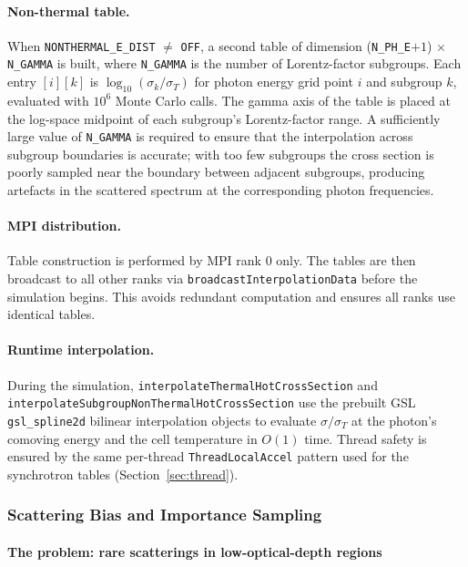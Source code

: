 \documentclass[12pt,a4paper]{article}
\newcommand{\code}[1]{\texttt{#1}}
\begin{document}
\paragraph{Non-thermal table.}
When \code{NONTHERMAL\_E\_DIST} $\ne$ \code{OFF}, a second table of
dimension (\code{N\_PH\_E}$+1$) $\times$ \code{N\_GAMMA} is built, where
\code{N\_GAMMA} is the number of Lorentz-factor subgroups.  Each entry
$[i][k]$ is $\log_{10}(\sigma_k/\sigma_T)$ for photon energy grid point
$i$ and subgroup $k$, evaluated with $10^6$ Monte Carlo calls.  The gamma
axis of the table is placed at the log-space midpoint of each subgroup's
Lorentz-factor range.  A sufficiently large value of \code{N\_GAMMA} is
required to ensure that the interpolation across subgroup boundaries is
accurate; with too few subgroups the cross section is poorly sampled near
the boundary between adjacent subgroups, producing artefacts in the
scattered spectrum at the corresponding photon frequencies.

\paragraph{MPI distribution.}
Table construction is performed by MPI rank 0 only.  The tables are then
broadcast to all other ranks via \code{broadcastInterpolationData} before
the simulation begins.  This avoids redundant computation and ensures all
ranks use identical tables.

\paragraph{Runtime interpolation.}
During the simulation, \code{interpolateThermalHotCrossSection} and
\code{interpolateSubgroupNonThermalHotCrossSection} use the prebuilt GSL
\code{gsl\_spline2d} bilinear interpolation objects to evaluate
$\sigma/\sigma_T$ at the photon's comoving energy and the cell temperature
in $O(1)$ time.  Thread safety is ensured by the same per-thread
\code{ThreadLocalAccel} pattern used for the synchrotron tables
(Section~\ref{sec:thread}).

\subsubsection{Scattering Bias and Importance Sampling}
\label{sec:bias}

\paragraph{The problem: rare scatterings in low-optical-depth regions}
\end{document}
